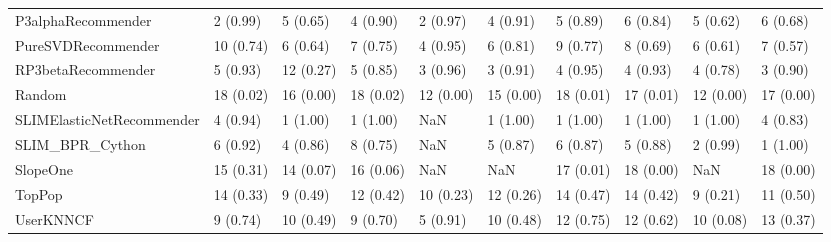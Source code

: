 \begin{tabular}{llllllllll}
                 P3alphaRecommender &                 2 (0.99) &    5 (0.65) &      4 (0.90) &     2 (0.97) &             4 (0.91) &            5 (0.89) &          6 (0.84) &           5 (0.62) &          6 (0.68) \\
                 PureSVDRecommender &                10 (0.74) &    6 (0.64) &      7 (0.75) &     4 (0.95) &             6 (0.81) &            9 (0.77) &          8 (0.69) &           6 (0.61) &          7 (0.57) \\
                 RP3betaRecommender &                 5 (0.93) &   12 (0.27) &      5 (0.85) &     3 (0.96) &             3 (0.91) &            4 (0.95) &          4 (0.93) &           4 (0.78) &          3 (0.90) \\
                             Random &                18 (0.02) &   16 (0.00) &     18 (0.02) &    12 (0.00) &            15 (0.00) &           18 (0.01) &         17 (0.01) &          12 (0.00) &         17 (0.00) \\
          SLIMElasticNetRecommender &                 4 (0.94) &    1 (1.00) &      1 (1.00) &          NaN &             1 (1.00) &            1 (1.00) &          1 (1.00) &           1 (1.00) &          4 (0.83) \\
                    SLIM\_BPR\_Cython &                 6 (0.92) &    4 (0.86) &      8 (0.75) &          NaN &             5 (0.87) &            6 (0.87) &          5 (0.88) &           2 (0.99) &          1 (1.00) \\
                           SlopeOne &                15 (0.31) &   14 (0.07) &     16 (0.06) &          NaN &                  NaN &           17 (0.01) &         18 (0.00) &                NaN &         18 (0.00) \\
                             TopPop &                14 (0.33) &    9 (0.49) &     12 (0.42) &    10 (0.23) &            12 (0.26) &           14 (0.47) &         14 (0.42) &           9 (0.21) &         11 (0.50) \\
                          UserKNNCF &                 9 (0.74) &   10 (0.49) &      9 (0.70) &     5 (0.91) &            10 (0.48) &           12 (0.75) &         12 (0.62) &          10 (0.08) &         13 (0.37) \\
\bottomrule
\end{tabular}
